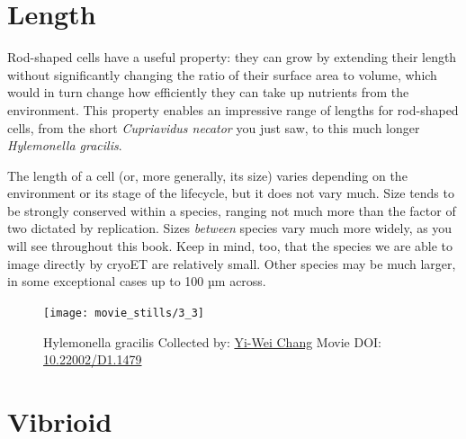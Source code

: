 \documentclass[]{tufte-book}
\begin{document}
\section{Length}\label{length}

Rod-shaped cells have a useful property: they can grow by extending
their length without significantly changing the ratio of their surface
area to volume, which would in turn change how efficiently they can take
up nutrients from the environment. This property enables an impressive
range of lengths for rod-shaped cells, from the short \emph{Cupriavidus
necator} you just saw, to this much longer \emph{Hylemonella gracilis}.

The length of a cell (or, more generally, its size) varies depending on
the environment or its stage of the lifecycle, but it does not vary
much. Size tends to be strongly conserved within a species, ranging not
much more than the factor of two dictated by replication. Sizes
\emph{between} species vary much more widely, as you will see throughout
this book. Keep in mind, too, that the species we are able to image
directly by cryoET are relatively small. Other species may be much
larger, in some exceptional cases up to 100 µm across.





\begin{figure}
\texttt{[image: movie\_stills/3\_3]} \caption[Hylemonella gracilis Collected by:
\protect\hyperlink{yi-wei_chang}{Yi-Wei Chang} Movie DOI:
\href{https://doi.org/10.22002/D1.1479}{10.22002/D1.1479}]{Hylemonella gracilis Collected by:
\protect\hyperlink{yi-wei_chang}{Yi-Wei Chang} Movie DOI:
\href{https://doi.org/10.22002/D1.1479}{10.22002/D1.1479}}\label{fig:3-3}
\end{figure}

\section{Vibrioid}\label{vibrioid}
\end{document}
